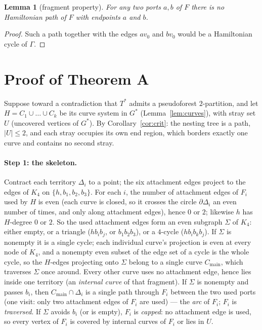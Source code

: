 \documentclass[11pt]{article}
\newtheorem{lemma}[theorem]{Lemma}
\theoremstyle{remark}
\newcommand{\Cmain}{C_{\mathrm{main}}}
\begin{document}
\begin{lemma}[fragment property]\label{lem:frag}
For any two ports $a,b$ of $F$ there is no Hamiltonian path of $F$ with
endpoints $a$ and $b$.
\end{lemma}

\begin{proof}
Such a path together with the edges $av_0$ and $bv_0$ would be a
Hamiltonian cycle of $\Gamma$.
\end{proof}

\section{Proof of Theorem A}\label{sec:proof}

Suppose toward a contradiction that $T^{*}$ admits a pseudoforest
$2$-partition, and let $H=C_1\cup\dots\cup C_k$ be its curve system in
$G^{*}$ (Lemma~\ref{lem:curves}), with stray set $U$ (uncovered vertices
of $G^{*}$). By Corollary~\ref{cor:crit}: the nesting tree is a path,
$|U|\le 2$, and each stray occupies its own end region, which borders
exactly one curve and contains no second stray.

\paragraph{Step 1: the skeleton.}
Contract each territory $\Delta_i$ to a point; the six attachment edges
project to the edges of $K_4$ on $\{h,b_1,b_2,b_3\}$. For each $i$, the
number of attachment edges of $F_i$ used by $H$ is even (each curve is
closed, so it crosses the circle $\partial\Delta_i$ an even number of
times, and only along attachment edges), hence $0$ or $2$; likewise $h$
has $H$-degree $0$ or $2$. So the used attachment edges form an even
subgraph $\Sigma$ of $K_4$: either empty, or a triangle ($hb_ib_j$, or
$b_1b_2b_3$), or a $4$-cycle ($hb_ib_kb_j$). If $\Sigma$ is nonempty it
is a single cycle; each individual curve's projection is even at every
node of $K_4$, and a nonempty even subset of the edge set of a cycle is
the whole cycle, so the $H$-edges projecting onto $\Sigma$ belong to a
single curve $\Cmain$, which traverses $\Sigma$ once around. Every other
curve uses no attachment edge, hence lies inside one territory (an
\emph{internal curve} of that fragment). If $\Sigma$ is nonempty and
passes $b_i$, then $\Cmain\cap\Delta_i$ is a single path through $F_i$
between the two used ports (one visit: only two attachment edges of
$F_i$ are used) --- the \emph{arc} of $F_i$; $F_i$ is \emph{traversed}.
If $\Sigma$ avoids $b_i$ (or is empty), $F_i$ is \emph{capped}: no
attachment edge is used, so every vertex of $F_i$ is covered by internal
curves of $F_i$ or lies in $U$.
\end{document}
